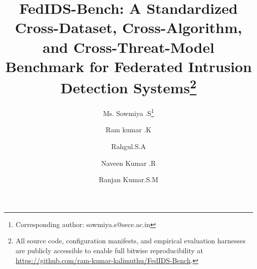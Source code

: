 \documentclass[runningheads]{llncs}
\begin{document}
\title{FedIDS-Bench: A Standardized Cross-Dataset, Cross-Algorithm, and Cross-Threat-Model Benchmark for Federated Intrusion Detection Systems\thanks{All source code, configuration manifests, and empirical evaluation harnesses are publicly accessible to enable full bitwise reproducibility at \url{https://github.com/ram-kumar-kalimuthu/FedIDS-Bench}.}}


\author{Ms. Sowmiya .S\thanks{Corresponding author: sowmiya.s@sece.ac.in} \and
Ram kumar .K \and
Rahgul.S.A \and
Naveen Kumar .R \and
Ranjan Kumar.S.M}



\maketitle
\end{document}

